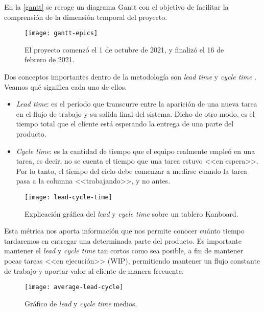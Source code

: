 En la \autoref{gantt} se recoge un diagrama Gantt con el objetivo de facilitar la comprensión de la dimensión temporal del proyecto.

\begin{figure}[h]
	\centering
	\texttt{[image: gantt-epics]}
	\vspace{-0.6cm}
	\caption[Diagrama Gantt del proyecto.]{El proyecto comenzó el 1 de octubre de 2021, y finalizó el 16 de febrero de 2021.}
	\label{gantt}
\end{figure}

Dos conceptos importantes dentro de la metodología son \emph{lead time} y \emph{cycle time} \cite{anderson10}. Veamos qué significa cada uno de ellos.

\vspace{-0.3cm}
\begin{itemize}[\textbullet]
	\item \emph{Lead time}: es el período que transcurre entre la aparición de una nueva tarea en el flujo de trabajo y su salida final del sistema. Dicho de otro modo, es el tiempo total que el cliente está esperando la entrega de una parte del producto.
	
	\item \emph{Cycle time}: es la cantidad de tiempo que el equipo realmente empleó en una tarea, es decir, no se cuenta el tiempo que una tarea estuvo <<en espera>>. Por lo tanto, el tiempo del ciclo debe comenzar a medirse cuando la tarea pasa a la columna <<trabajando>>, y no antes.
\end{itemize}

\begin{figure}[h]
	\centering
	\texttt{[image: lead-cycle-time]}
	\vspace{-0.6cm}
	\caption[Visualización del \emph{lead} y \emph{cycle time}.]{Explicación gráfica del \emph{lead} y \emph{cycle time} sobre un tablero Kanboard.}
\end{figure}

Esta métrica nos aporta información que nos permite conocer cuánto tiempo tardaremos en entregar una determinada parte del producto. Es importante mantener el \emph{lead} y \emph{cycle time} tan cortos como sea posible, a fin de mantener pocas tareas <<en ejecución>> (WIP), permitiendo mantener un flujo constante de trabajo y aportar valor al cliente de manera frecuente.

\begin{figure}[h]
	\centering
	\texttt{[image: average-lead-cycle]}
	\vspace{-0.7cm}
	\caption{Gráfico de \emph{lead} y \emph{cycle time} medios.}
	\label{average-lead-cycle}
\end{figure}

